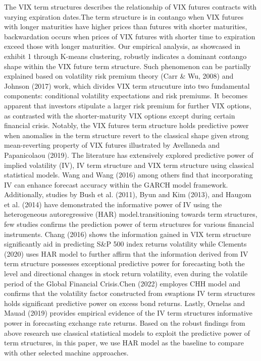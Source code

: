 \documentclass[10pt,letterpaper]{article}
\begin{document}
The VIX term structures describes the relationship of VIX futures contracts with varying expiration dates.The term structure is in contango when VIX futures with longer maturities have higher prices than futures with shorter maturities, backwardation occurs when prices of VIX futures with shorter time to expiration exceed those with longer maturities. Our empirical analysis,  as showcased in exhibit 1 through K-means clustering, robustly indicates a dominant contango shape within the VIX future term structure. Such phenomenon can be partially explained based on volatility risk premium theory (Carr \& Wu, 2008) and  Johnson (2017) work, which divides VIX term strucuture  into two fundamental components: conditional volatility expectations and risk premiums. It becomes apparent that investors stipulate a larger risk premium for further VIX options, as contrasted with the shorter-maturity VIX options except during certain financial crisis. Notably, the VIX futures term structure holds predictive power when anomalies in the term structure revert to the classical shape given strong mean-reverting property of VIX futures illustrated by Avellaneda and Papanicolaou (2019).
The literature has extensively explored predictive power of implied volatility (IV),  IV term structure and VIX term structure using classical statistical models. Wang and Wang (2016) among others find that incorporating IV can enhance forecast accuracy within the GARCH model framework. Additionally, studies by Bush et al. (2011), Byun and Kim (2013), and Haugom et al. (2014) have demonstrated the informative power of IV using the heterogeneous autoregressive (HAR) model.transitioning towards term structures, few studies confirms the prediction power of term structures for various financial instruments. Chang (2016) shows the information gained in VIX term structure significantly aid in predicting S\&P 500 index returns volatility while Clements (2020) uses HAR model to further affirm that the information derived from IV term structure possesses exceptional predictive power for forecasting both the level and directional changes in stock return volatility, even during the volatile period of the Global Financial Crisis.Chen (2022) employes CHH model and confirms that the volatility factor constructed from swaptions IV term structures holds significant predictive power on excess bond returns. Lastly, Ornelas and Mauad (2019) provides empirical evidence of the IV term structures informative power in forecasting exchange rate returns. Based on the robust findings from above research use classical statistical models to exploit the predictive power of term structures, in this paper, we use HAR model as the baseline to compare with other selected machine approaches.
\end{document}
